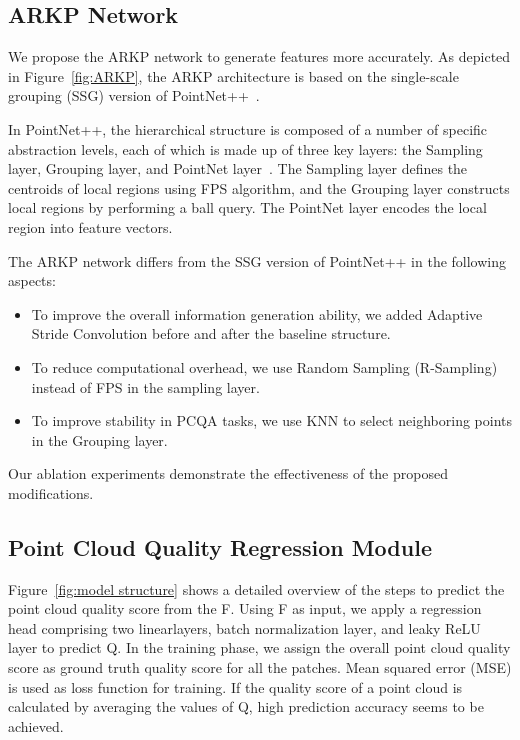 \documentclass[conference]{IEEEtran}
\begin{document}
\subsection{ARKP Network}
We propose the ARKP network to generate features more accurately.
As depicted in Figure~\ref{fig:ARKP}, the ARKP architecture is based on the single-scale grouping (SSG) version of PointNet++~\cite{qi2017pointnet++}.

In PointNet++, the hierarchical structure is composed of a number of specific abstraction levels, each of which is made up of three key layers: the Sampling layer, Grouping layer, and PointNet layer~\cite{qi2017pointnet++}. The Sampling layer defines the centroids of local regions using FPS algorithm, and the Grouping layer constructs local regions by performing a ball query. The PointNet layer encodes the local region into feature vectors.

The ARKP network differs from the SSG version of PointNet++ in the following aspects:
\begin{itemize}
    \item To improve the overall information generation ability, we added Adaptive Stride Convolution before and after the baseline structure.
    \item To reduce computational overhead, we use Random Sampling (R-Sampling) instead of FPS in the sampling layer.
    \item To improve stability in PCQA tasks, we use KNN to select neighboring points in the Grouping layer.
\end{itemize}
Our ablation experiments demonstrate the effectiveness of the proposed modifications.



\subsection{Point Cloud Quality Regression Module}
Figure~\ref{fig:model structure} shows a detailed overview of the steps to predict the point cloud quality score from the F. Using F as input, we apply a regression head comprising two linearlayers, batch normalization layer, and leaky ReLU layer to predict Q. In the training phase, we assign the overall point cloud quality score as ground truth quality score for all the patches. Mean squared error (MSE) is used as loss function for training. If the quality score of a point cloud is calculated by averaging the values of Q, high prediction accuracy seems to be achieved.
\end{document}
